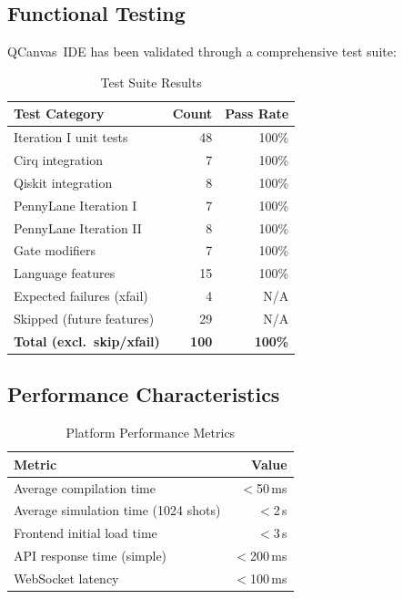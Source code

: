 \documentclass[conference]{IEEEtran}
\begin{document}
\subsection{Functional Testing}

QCanvas~IDE has been validated through a comprehensive test suite:

\begin{table}[t]
\centering
\caption{Test Suite Results}
\label{tab:tests}
\begin{tabular}{@{}lrr@{}}
\toprule
\textbf{Test Category} & \textbf{Count} & \textbf{Pass Rate} \\
\midrule
Iteration I unit tests       & 48 & 100\% \\
Cirq integration             & 7  & 100\% \\
Qiskit integration           & 8  & 100\% \\
PennyLane Iteration I        & 7  & 100\% \\
PennyLane Iteration II       & 8  & 100\% \\
Gate modifiers               & 7  & 100\% \\
Language features             & 15 & 100\% \\
Expected failures (xfail)    & 4  & N/A \\
Skipped (future features)    & 29 & N/A \\
\midrule
\textbf{Total (excl.\ skip/xfail)} & \textbf{100} & \textbf{100\%} \\
\bottomrule
\end{tabular}
\end{table}

\subsection{Performance Characteristics}

\begin{table}[t]
\centering
\caption{Platform Performance Metrics}
\label{tab:performance}
\begin{tabular}{@{}lr@{}}
\toprule
\textbf{Metric} & \textbf{Value} \\
\midrule
Average compilation time     & $<$50\,ms \\
Average simulation time (1024 shots) & $<$2\,s \\
Frontend initial load time   & $<$3\,s \\
API response time (simple)   & $<$200\,ms \\
WebSocket latency            & $<$100\,ms \\
\bottomrule
\end{tabular}
\end{table}
\end{document}
